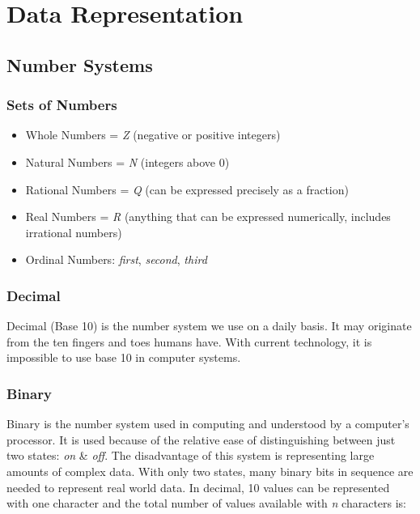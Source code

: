 \documentclass[10pt]{article}
\let\oldsection\section
\renewcommand\section{\clearpage\oldsection}
\begin{document}
\section{Data Representation}
\label{sec:org6ff8868}
\subsection{Number Systems}
\label{sec:org35efcd7}
\subsubsection{Sets of Numbers}
\label{sec:orgb771fd5}

\begin{itemize}
\item Whole Numbers = \emph{Z} (negative or positive integers)
\item Natural Numbers = \emph{N} (integers above 0)
\item Rational Numbers = \emph{Q} (can be expressed precisely as a fraction)
\item Real Numbers = \emph{R} (anything that can be expressed numerically, includes irrational numbers)
\item Ordinal Numbers: \emph{first}, \emph{second}, \emph{third}
\end{itemize}

\subsubsection{Decimal}
\label{sec:org1614a02}

Decimal (Base 10) is the number system we use on a daily basis. It may originate from the ten fingers and toes humans have. With current technology, it is impossible to use base 10 in computer systems.

\subsubsection{Binary}
\label{sec:org72ea446}

Binary is the number system used in computing and understood by a computer's processor. It is used because of the relative ease of distinguishing between just two states: \emph{on} \& \emph{off}. The disadvantage of this system is representing large amounts of complex data. With only two states, many binary bits in sequence are needed to represent real world data. In decimal, 10 values can be represented with one character and the total number of values available with \emph{n} characters is:
\end{document}
